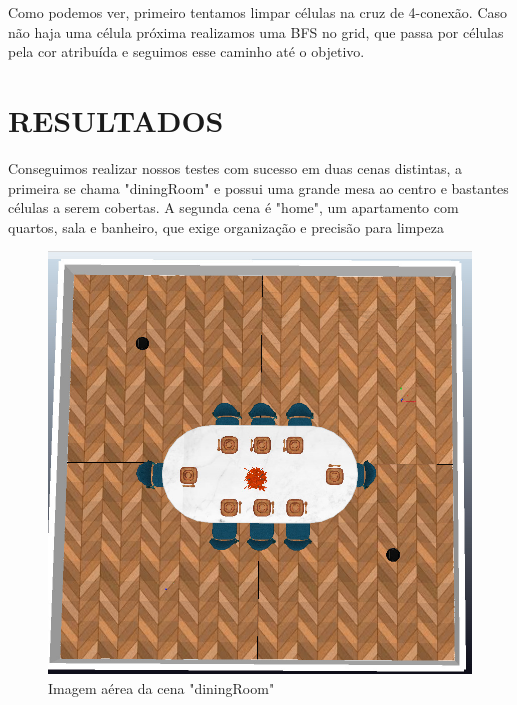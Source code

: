 \documentclass[a4paper, 10pt, conference]{ieeeconf}      %
\begin{document}
Como podemos ver, primeiro tentamos limpar células na cruz de 4-conexão. Caso não haja
uma célula próxima realizamos uma BFS no grid, que passa por células pela cor atribuída
e seguimos esse caminho até o objetivo.


\section{RESULTADOS}

Conseguimos realizar nossos testes com sucesso em duas cenas distintas, a primeira se chama
"diningRoom" e possui uma grande mesa ao centro e bastantes células a serem cobertas. A segunda
cena é "home", um apartamento com quartos, sala e banheiro, que exige organização e precisão para limpeza

\begin{figure}[htb!]
    \centering
    \includegraphics[scale=0.15]{../diner_pic.jpeg}
    \caption{Imagem aérea da cena "diningRoom"}
\end{figure}
\end{document}
